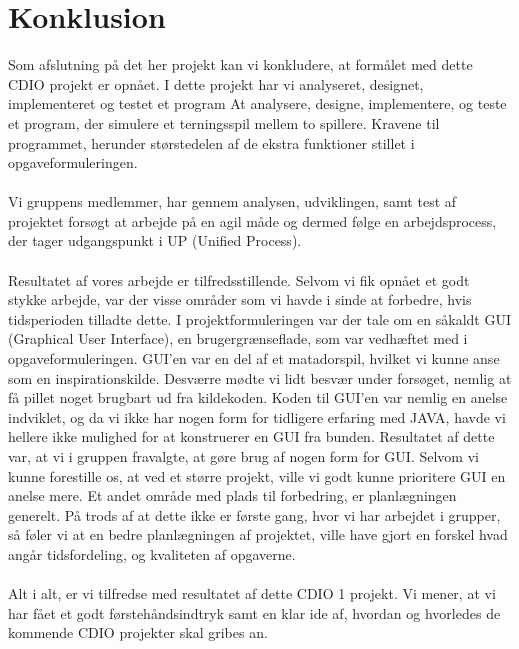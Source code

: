 \chapter{Konklusion}

Som afslutning på det her projekt kan vi konkludere, at formålet med dette CDIO projekt er opnået. 
I dette projekt har vi analyseret, designet, implementeret og testet et program
At analysere, designe, implementere, og teste et program, der simulere et terningsspil mellem to spillere.
Kravene til programmet, herunder størstedelen af de ekstra funktioner stillet i opgaveformuleringen.
\\
\\
Vi gruppens medlemmer, har gennem analysen, udviklingen, samt test af projektet forsøgt at arbejde på en agil måde og dermed følge en arbejdsprocess, der tager udgangspunkt i UP (Unified Process).
\\
\\
Resultatet af vores arbejde er tilfredsstillende.
Selvom vi fik opnået et godt stykke arbejde, var der visse områder som vi havde i sinde at forbedre, hvis tidsperioden tilladte dette.
I projektformuleringen var der tale om en såkaldt GUI (Graphical User Interface), en brugergrænseflade, som var vedhæftet med i opgaveformuleringen.
GUI’en var en del af et matadorspil, hvilket vi kunne anse som en inspirationskilde.
Desværre mødte vi lidt besvær under forsøget, nemlig at få pillet noget brugbart ud fra kildekoden.
Koden til GUI’en var nemlig en anelse indviklet, og da vi ikke har nogen form for tidligere erfaring med JAVA, havde vi hellere ikke mulighed for at konstruerer en GUI fra bunden.
Resultatet af dette var, at vi i gruppen fravalgte, at gøre brug af nogen form for GUI.
Selvom vi kunne forestille os, at ved et større projekt, ville vi godt kunne prioritere GUI en anelse mere.
Et andet område med plads til forbedring, er planlægningen generelt. 
På trods af at dette ikke er første gang, hvor vi har arbejdet i grupper, så føler vi at en bedre planlægningen af projektet, ville have gjort en forskel hvad angår tidsfordeling, og kvaliteten af opgaverne.
\\
\\
Alt i alt, er vi tilfredse med resultatet af dette CDIO 1 projekt.
Vi mener, at vi har fået et godt førstehåndsindtryk samt en klar ide af, hvordan og hvorledes de kommende CDIO projekter skal gribes an.
